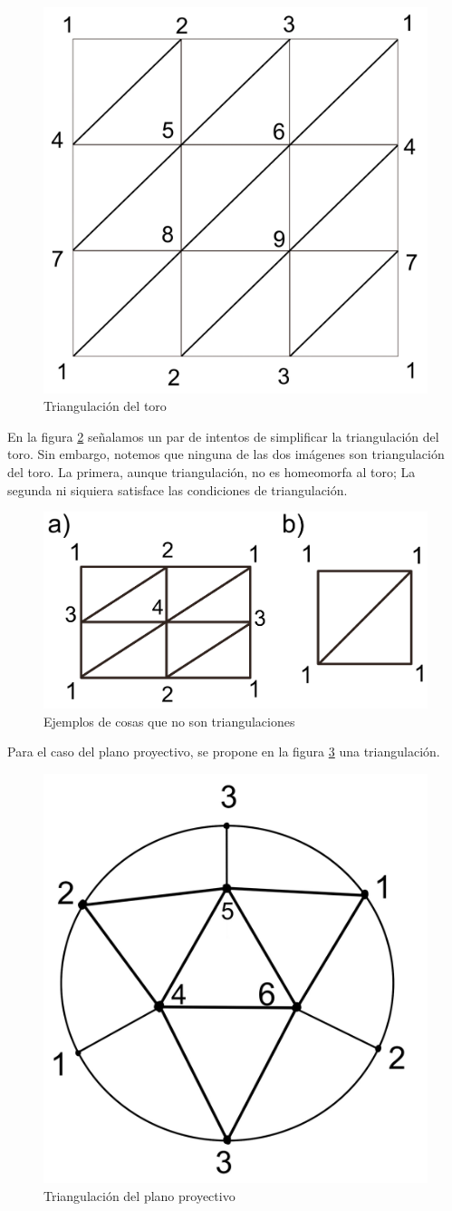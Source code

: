 \documentclass[a4paper,11pt,spanish, twoside, leqno]{tfg-uam}
\theoremstyle{definition}
\begin{document}
\begin{figure}[h!]
	\centering
	\includegraphics[width=0.3\linewidth]{imagenes/toro_triangulado.png}
	\caption{Triangulación del toro}
	\label{fig:toro triangulado}
\end{figure} 

En la figura \ref{fig:no triangulaciones} señalamos un par de intentos de simplificar la triangulación del toro. Sin embargo, notemos que ninguna de las dos imágenes son triangulación del toro. La primera, aunque triangulación, no es homeomorfa al toro; La segunda ni siquiera satisface las condiciones de triangulación.

\begin{figure}[h!]
	\centering
	\includegraphics[width=0.5\linewidth]{imagenes/no_triangulaciones.png}
	\caption{Ejemplos de cosas que no son triangulaciones}
	
	\label{fig:no triangulaciones}
\end{figure} 

Para el caso del plano proyectivo, se propone en la figura \ref{fig:plano proyectivo triangulado} una triangulación.

\begin{figure}[h!]
	\centering
	\includegraphics[width=0.3\linewidth]{imagenes/planop_triangulado.png}
	\caption{Triangulación del plano proyectivo}
	\label{fig:plano proyectivo triangulado}
\end{figure} 
\end{document}
